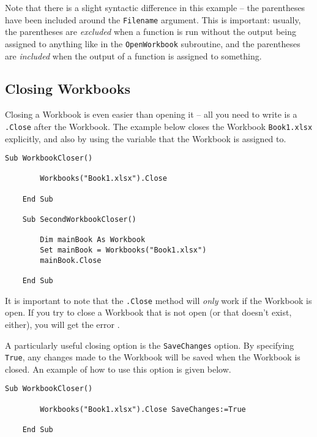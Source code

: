 \documentclass[11pt]{article}%
\begin{document}
Note that there is a slight syntactic difference in this example -- the parentheses have been included around the \texttt{Filename} argument. This is important: usually, the parentheses are \textit{excluded} when a function is run without the output being assigned to anything like in the \texttt{OpenWorkbook} subroutine, and the parentheses are \textit{included} when the output of a function is assigned to something.



\subsection{Closing Workbooks}

Closing a Workbook is even easier than opening it -- all you need to write is a \texttt{.Close} after the Workbook. The example below closes the Workbook \texttt{Book1.xlsx} explicitly, and also by using the variable that the Workbook is assigned to.\\

\begin{lstlisting}[style=A]
    Sub WorkbookCloser()

        Workbooks("Book1.xlsx").Close

    End Sub

    Sub SecondWorkbookCloser()

        Dim mainBook As Workbook
        Set mainBook = Workbooks("Book1.xlsx")
        mainBook.Close

    End Sub
\end{lstlisting}

It is important to note that the \texttt{.Close} method will \textit{only} work if the Workbook is open. If you try to close a Workbook that is not open (or that doesn't exist, either), you will get the error .

A particularly useful closing option is the \texttt{SaveChanges} option. By specifying \texttt{True}, any changes made to the Workbook will be saved when the Workbook is closed. An example of how to use this option is given below.\\

\begin{lstlisting}[style=A]
    Sub WorkbookCloser()

        Workbooks("Book1.xlsx").Close SaveChanges:=True

    End Sub
\end{lstlisting}
\end{document}
